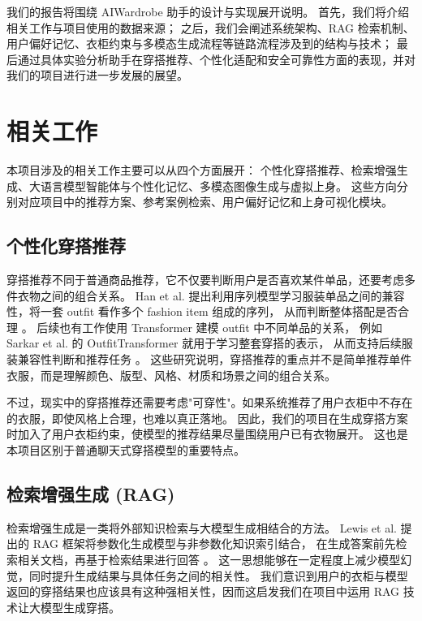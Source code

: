 \documentclass{applemlr}
\begin{document}
我们的报告将围绕 AIWardrobe 助手的设计与实现展开说明。
首先，我们将介绍相关工作与项目使用的数据来源；
之后，我们会阐述系统架构、RAG 检索机制、用户偏好记忆、衣柜约束与多模态生成流程等链路流程涉及到的结构与技术；
最后通过具体实验分析助手在穿搭推荐、个性化适配和安全可靠性方面的表现，并对我们的项目进行进一步发展的展望。


\section{相关工作}
\label{sec:related-works}

本项目涉及的相关工作主要可以从四个方面展开：
个性化穿搭推荐、检索增强生成、大语言模型智能体与个性化记忆、多模态图像生成与虚拟上身。
这些方向分别对应项目中的推荐方案、参考案例检索、用户偏好记忆和上身可视化模块。

\subsection{个性化穿搭推荐}

穿搭推荐不同于普通商品推荐，它不仅要判断用户是否喜欢某件单品，还要考虑多件衣物之间的组合关系。
Han et al. 提出利用序列模型学习服装单品之间的兼容性，将一套 outfit 看作多个 fashion item 组成的序列，
从而判断整体搭配是否合理 \citep{han2017learning}。
后续也有工作使用 Transformer 建模 outfit 中不同单品的关系，
例如 Sarkar et al. 的 OutfitTransformer 就用于学习整套穿搭的表示，
从而支持后续服装兼容性判断和推荐任务 \citep{sarkar2023outfittransformer}。
这些研究说明，穿搭推荐的重点并不是简单推荐单件衣服，而是理解颜色、版型、风格、材质和场景之间的组合关系。

不过，现实中的穿搭推荐还需要考虑"可穿性"。如果系统推荐了用户衣柜中不存在的衣服，即使风格上合理，也难以真正落地。
因此，我们的项目在生成穿搭方案时加入了用户衣柜约束，使模型的推荐结果尽量围绕用户已有衣物展开。
这也是本项目区别于普通聊天式穿搭模型的重要特点。

\subsection{检索增强生成 (RAG)}

检索增强生成是一类将外部知识检索与大模型生成相结合的方法。
Lewis et al. 提出的 RAG 框架将参数化生成模型与非参数化知识索引结合，
在生成答案前先检索相关文档，再基于检索结果进行回答 \citep{lewis2020retrieval}。
这一思想能够在一定程度上减少模型幻觉，同时提升生成结果与具体任务之间的相关性。
我们意识到用户的衣柜与模型返回的穿搭结果也应该具有这种强相关性，因而这启发我们在项目中运用 RAG 技术让大模型生成穿搭。
\end{document}
